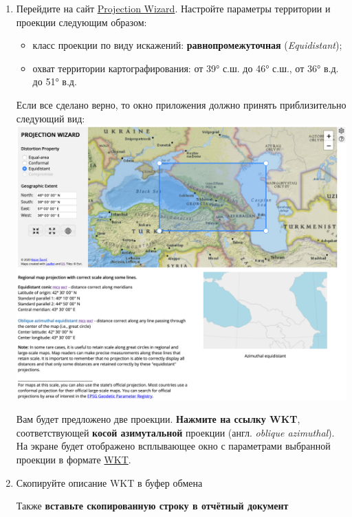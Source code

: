 \documentclass[
  12pt,
]{book}
\providecommand{\tightlist}{%
  \setlength{\itemsep}{0pt}\setlength{\parskip}{0pt}}
\begin{document}
\begin{enumerate}
\def\labelenumi{\arabic{enumi}.}
\item
  Перейдите на сайт \href{http://projectionwizard.org/}{Projection Wizard}. Настройте параметры территории и проекции следующим образом:

  \begin{itemize}
  \tightlist
  \item
    класс проекции по виду искажений: \textbf{равнопромежуточная} (\emph{Equidistant});
  \item
    охват территории картографирования: от 39° с.ш. до 46° с.ш., от 36° в.д. до 51° в.д.
  \end{itemize}

  Если все сделано верно, то окно приложения должно принять приблизительно следующий вид:
  \includegraphics{images/Ex01/pwizard.png}

  Вам будет предложено две проекции. \textbf{Нажмите на ссылку WKT}, соответствующей \textbf{косой азимутальной} проекции (англ. \emph{oblique azimuthal}). На экране будет отображено всплывающее окно с параметрами выбранной проекции в формате \href{https://docs.geotools.org/stable/javadocs/org/opengis/referencing/doc-files/WKT.html}{WKT}.
\item
  Скопируйте описание WKT в буфер обмена

  Также \textbf{вставьте скопированную строку в отчётный документ}


\end{enumerate}
\end{document}
